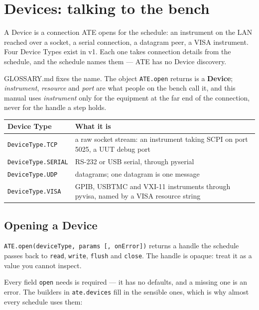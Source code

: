 \chapter{Devices: talking to the bench}\label{ch:devices}

A Device is a connection ATE opens for the schedule: an instrument on the LAN reached over a
socket, a serial connection, a datagram peer, a VISA instrument. Four Device Types exist in v1.
Each one takes connection details from the schedule, and the schedule names them --- ATE has no
Device discovery.

GLOSSARY.md fixes the name. The object \texttt{ATE.open} returns is a \textbf{Device}; \emph{instrument},
\emph{resource} and \emph{port} are what people on the bench call it, and this manual uses
\emph{instrument} only for the equipment at the far end of the connection, never for the handle a
step holds.

\begin{center}
\footnotesize
\begin{tabular}{@{}>{\raggedright\arraybackslash}p{3.4cm}>{\raggedright\arraybackslash}p{11.2cm}@{}}
\toprule
Device Type & What it is \\
\midrule
\texttt{DeviceType.TCP} & a raw socket stream: an instrument taking SCPI on port 5025, a UUT
  debug port \\
\texttt{DeviceType.SERIAL} & RS-232 or USB serial, through pyserial \\
\texttt{DeviceType.UDP} & datagrams; one datagram is one message \\
\texttt{DeviceType.VISA} & GPIB, USBTMC and VXI-11 instruments through pyvisa, named by a VISA
  resource string \\
\bottomrule
\end{tabular}
\end{center}

\section{Opening a Device}

\texttt{ATE.open(deviceType, params [, onError])} returns a handle the schedule passes back to
\texttt{read}, \texttt{write}, \texttt{flush} and \texttt{close}. The handle is opaque: treat it
as a value you cannot inspect.

Every field \texttt{open} needs is required --- it has no defaults, and a missing one is an
error. The builders in \texttt{ate.devices} fill in the sensible ones, which is why almost
every schedule uses them:

